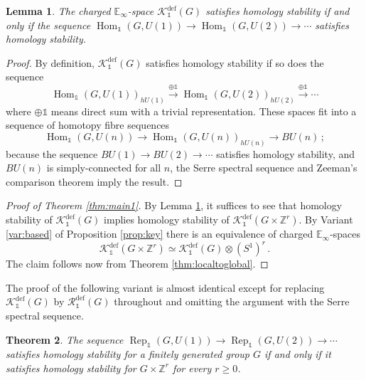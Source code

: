 \documentclass[oneside, a4paper, 12pt]{article}
\numberwithin{equation}{section}
\DeclareMathOperator{\Rep}{Rep}
\DeclareMathOperator{\Hom}{Hom}
\newcommand{\Kdef}{\mathcal{K}^{\mathrm{def}}}
\newcommand{\Rdef}{\mathcal{R}^{\mathrm{def}}}
\newcommand{\Z}{\mathbb{Z}}
\theoremstyle{plain}
\newtheorem{theorem}{Theorem}[section]
\newtheorem{lemma}[theorem]{Lemma}
\theoremstyle{definition}
\theoremstyle{remark}
\begin{document}
\begin{lemma} \label{lem:homologystability}
The charged $\mathbb{E}_\infty$-space $\Kdef_{\mathds{1}}(G)$ satisfies homology stability if and only if the sequence $\Hom_{\mathds{1}}(G,U(1)) \to \Hom_{\mathds{1}}(G,U(2)) \to \cdots$ satisfies homology stability.
\end{lemma}
\begin{proof}
By definition, $\Kdef_{\mathds{1}}(G)$ satisfies homology stability if so does the sequence
\[
\Hom_{\mathds{1}}(G,U(1))_{hU(1)} \xrightarrow{\oplus \mathds{1}} \Hom_{\mathds{1}}(G,U(2))_{hU(2)} \xrightarrow{\oplus \mathds{1}} \cdots
\]
where $\oplus \mathds{1}$ means direct sum with a trivial representation. These spaces fit into a sequence of homotopy fibre sequences
\[
\Hom_{\mathds{1}}(G,U(n))\to \Hom_{\mathds{1}}(G,U(n))_{hU(n)} \to BU(n)\,;
\]
because the sequence $BU(1)\to BU(2)\to \cdots$ satisfies homology stability, and $BU(n)$ is simply-connected for all $n$, the Serre spectral sequence and Zeeman's comparison theorem imply the result.
\end{proof}

\begin{proof}[Proof of Theorem \ref{thm:main1}]
By Lemma \ref{lem:homologystability}, it suffices to see that homology stability of $\Kdef_{\mathds{1}}(G)$ implies homology stability of $\Kdef_{\mathds{1}}(G\times \Z^r)$. By Variant \ref{var:based} of Proposition \ref{prop:key} there is an equivalence of charged $\mathbb{E}_\infty$-spaces
\[
\Kdef_{\mathds{1}}(G\times \Z^r) \simeq \Kdef_{\mathds{1}}(G) \otimes (S^1)^r\, .
\]
The claim follows now from Theorem \ref{thm:localtoglobal}.
\end{proof}

The proof of the following variant is almost identical except for replacing $\Kdef_{\mathds{1}}(G)$ by $\Rdef_{\mathds{1}}(G)$ throughout and omitting the argument with the Serre spectral sequence.


\begin{theorem} \label{thm:main2}
The sequence $\Rep_{\mathds{1}}(G,U(1)) \to \Rep_{\mathds{1}}(G,U(2)) \to \cdots$ satisfies homology stability for a finitely generated group $G$ if and only if it satisfies homology stability for $G\times \Z^r$ for every $r\geq 0$.
\end{theorem}
\end{document}
